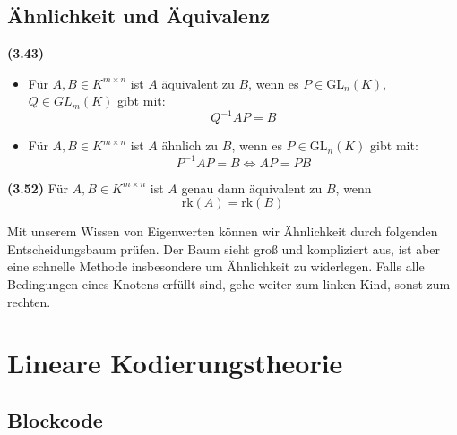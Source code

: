 \documentclass[11pt]{scrartcl}
\newlength{\hangwidth}
\newcommand{\skript}[1]{\settowidth{\hangwidth}{\textbf{(#1)} }\hangpara{\hangwidth}{1}\textbf{(#1)} }%
\newcommand{\rk}{\mathrm{rk}}%
\newcommand{\GL}{\mathrm{GL}}%
\newcommand{\geo}{\mathrm{g}}%
\newcommand{\mul}{\mathrm{m}}%
\begin{document}
\subsection{Ähnlichkeit und Äquivalenz}

\skript{3.43} \begin{itemize}
	\item Für $A, B \in K^{m \times n}$ ist $A$ äquivalent zu $B$, wenn es $P \in \GL_n(K)$, $Q \in GL_m(K)$ gibt mit: $$Q^{-1} A P = B$$
	\item Für $A, B \in K^{m \times n}$ ist $A$ ähnlich zu $B$, wenn es $P \in \GL_n(K)$ gibt mit: $$P^{-1} A P = B \iff A P = P B$$
\end{itemize}

\skript{3.52} Für $A, B \in K^{m \times n}$ ist $A$ genau dann äquivalent zu $B$, wenn $$\rk(A) = \rk(B)$$

Mit unserem Wissen von Eigenwerten können wir Ähnlichkeit durch folgenden Entscheidungsbaum prüfen. Der Baum sieht groß und kompliziert aus, ist aber eine schnelle Methode insbesondere um Ähnlichkeit zu widerlegen. Falls alle Bedingungen eines Knotens erfüllt sind, gehe weiter zum linken Kind, sonst zum rechten.


\section{Lineare Kodierungstheorie}

\subsection{Blockcode}
\end{document}
